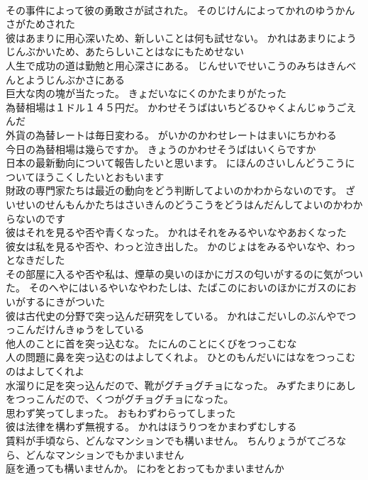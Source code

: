 \documentclass[8pt]{extreport}
\begin{document}
\begin{CJK}{UTF8}{min}
\\	その事件によって彼の勇敢さが試された。	そのじけんによってかれのゆうかんさがためされた 
\\	彼はあまりに用心深いため、新しいことは何も試せない。	かれはあまりにようじんぶかいため、あたらしいことはなにもためせない 
\\	人生で成功の道は勤勉と用心深さにある。	じんせいでせいこうのみちはきんべんとようじんぶかさにある 
\\	巨大な肉の塊が当たった。	きょだいなにくのかたまりがたった 
\\	為替相場は１ドル１４５円だ。	かわせそうばはいちどるひゃくよんじゅうごえんだ 
\\	外貨の為替レートは毎日変わる。	がいかのかわせレートはまいにちかわる 
\\	今日の為替相場は幾らですか。	きょうのかわせそうばはいくらですか 
\\	日本の最新動向について報告したいと思います。	にほんのさいしんどうこうについてほうこくしたいとおもいます 
\\	財政の専門家たちは最近の動向をどう判断してよいのかわからないのです。	ざいせいのせんもんかたちはさいきんのどうこうをどうはんだんしてよいのかわからないのです 
\\	彼はそれを見るや否や青くなった。	かれはそれをみるやいなやあおくなった 
\\	彼女は私を見るや否や、わっと泣き出した。	かのじょはをみるやいなや、わっとなきだした 
\\	その部屋に入るや否や私は、煙草の臭いのほかにガスの匂いがするのに気がついた。	そのへやにはいるやいなやわたしは、たばこのにおいのほかにガスのにおいがするにきがついた 
\\	彼は古代史の分野で突っ込んだ研究をしている。	かれはこだいしのぶんやでつっこんだけんきゅうをしている 
\\	他人のことに首を突っ込むな。	たにんのことにくびをつっこむな 
\\	人の問題に鼻を突っ込むのはよしてくれよ。	ひとのもんだいにはなをつっこむのはよしてくれよ 
\\	水溜りに足を突っ込んだので、靴がグチョグチョになった。	みずたまりにあしをつっこんだので、くつがグチョグチョになった。 
\\	思わず笑ってしまった。	おもわずわらってしまった 
\\	彼は法律を構わず無視する。	かれはほうりつをかまわずむしする 
\\	賃料が手頃なら、どんなマンションでも構いません。	ちんりょうがてごろなら、どんなマンションでもかまいません 
\\	庭を通っても構いませんか。	にわをとおってもかまいませんか 

\end{CJK}
\end{document}
